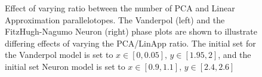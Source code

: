 \begin{figure}
\hspace*{\ratiovolhorshift}

\caption{Effect of varying ratio between the number of PCA and Linear Approximation parallelotopes. The Vanderpol (left) and the FitzHugh-Nagumo Neuron (right) phase plots are shown to illustrate differing effects of varying the PCA/LinApp ratio. The initial set for the Vanderpol model is set to $x \in [0,0.05], \, y \in [1.95,2]$, and the initial set Neuron model is set to $x \in [0.9, 1.1], \, y \in [2.4,2.6]$}
\label{fig:PCALinAppRatio}
\end{figure}
